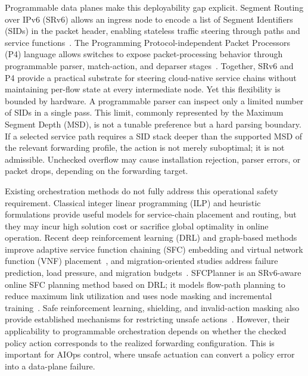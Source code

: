 \documentclass[final,5p]{elsarticle}
\newcommand{\rev}[1]{\textcolor{revisiongreen}{#1}}
\let\newrev\rev
\begin{document}
Programmable data planes make this deployability gap explicit. \newrev{Segment Routing over IPv6 (SRv6) allows an ingress node to encode a list of Segment Identifiers (SIDs) in the packet header, enabling stateless traffic steering through paths and service functions~\cite{rfc8754,rfc8986,rfc9352}.} \newrev{The Programming Protocol-independent Packet Processors (P4) language allows switches to expose packet-processing behavior through programmable parser, match-action, and deparser stages~\cite{jeyakumar2014p4}.} Together, SRv6 and P4 provide a practical substrate for steering cloud-native service chains without maintaining per-flow state at every intermediate node. Yet this flexibility is bounded by hardware. A programmable parser can inspect only a limited number of SIDs in a single pass. This limit, commonly represented by the Maximum Segment Depth (MSD), is not a tunable preference but a hard parsing boundary. If a selected service path requires a SID stack deeper than the supported MSD of the relevant forwarding profile, the action is not merely suboptimal; it is not admissible. \rev{Unchecked overflow may cause installation rejection, parser errors, or packet drops, depending on the forwarding target.}

Existing orchestration methods do not fully address this operational safety requirement. Classical \rev{integer linear programming (ILP)} and heuristic formulations provide useful models for service-chain placement and routing, but they \rev{may incur high solution cost or sacrifice global optimality in online operation}. Recent \rev{deep reinforcement learning (DRL)} and graph-based methods improve adaptive \rev{service function chaining (SFC)} embedding and \rev{virtual network function (VNF)} placement~\cite{wang2021drl,xiao2023twostage,liu2024sfcml,taktak2024drl,wu2025drl}, and migration-oriented studies address failure prediction, load pressure, and migration budgets~\cite{zhai2023migration,addad2022ai,qin2023sfcmigrationbudget,afrasiabi2024cluster,zhang2025sfcmigration,hu2026rlpmo}. SFCPlanner is an SRv6-aware online SFC planning method based on DRL; it models flow-path planning to reduce maximum link utilization and uses node masking and incremental training~\cite{qiu2024sfcplanner}. \rev{Safe reinforcement learning, shielding, and invalid-action masking also provide established mechanisms for restricting unsafe actions~\cite{gu2024safe,wachi2024constraint,huang2022closer}. However, their applicability to programmable orchestration depends on whether the checked policy action corresponds to the realized forwarding configuration.} This is \rev{important} for AIOps control, where unsafe actuation can convert a policy error into a data-plane failure.
\end{document}
